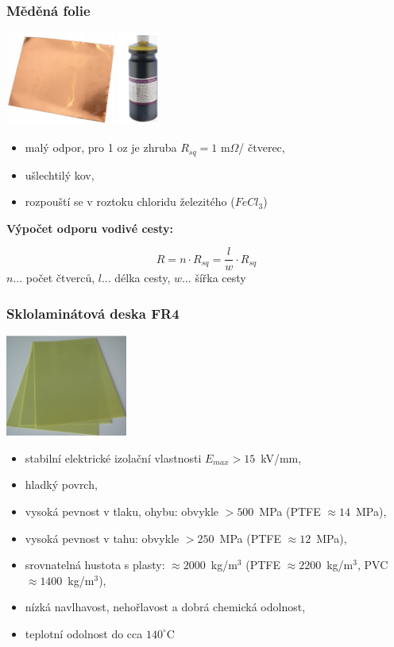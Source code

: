 \documentclass{beamer}
\begin{document}
\begin{frame}
	\frametitle{Měděná folie}
	
	
	\begin{center}
		\includegraphics[width=0.38\textwidth]{CU.png}
	\end{center}
	
	\begin{itemize}
		\item malý odpor, pro 1 oz je zhruba $R_{sq}= 1$ m$\Omega$/ čtverec,
		\item ušlechtilý kov,
		\item rozpouští se v roztoku chloridu železitého ($FeCl_3$)
	\end{itemize}
	\textbf{Výpočet odporu vodivé cesty:}
	
		\[
		R= n \cdot R_{sq} = \frac{l}{w} \cdot R_{sq}
	\]
	\small
	$n$... počet čtverců, $l$... délka cesty, $w$... šířka cesty
	
\end{frame}
\begin{frame}
	\frametitle{Sklolaminátová deska FR4}
	
	
	\begin{center}
		\includegraphics[width=0.30\textwidth]{FR4.png}
	\end{center}
	
	\begin{itemize}
		\item stabilní elektrické izolační vlastnosti $E_{max}> 15$~kV/mm,
		\item hladký povrch,
		\item vysoká pevnost v tlaku, ohybu: obvykle $>500$~MPa (PTFE $\approx 14$~MPa),
		\item vysoká pevnost v tahu: obvykle $>250$~MPa (PTFE $\approx 12$~MPa),
		\item srovnatelná hustota s plasty: $\approx 2000$~kg/m$^3$ (PTFE $\approx 2200$~kg/m$^3$, PVC $\approx 1400$~kg/m$^3$),
		\item nízká navlhavost, nehořlavost a dobrá chemická odolnost,
		\item teplotní odolnost do cca $140^\circ$C
		
	\end{itemize}
	
\end{frame}
\end{document}
